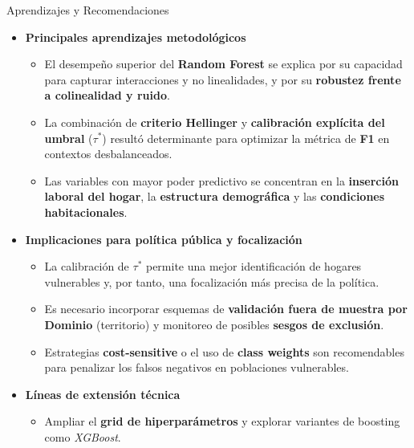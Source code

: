 \documentclass[10pt]{beamer}
\begin{document}
\begin{frame}{Aprendizajes y Recomendaciones}
\small
\begin{itemize}
  \item \textbf{Principales aprendizajes metodológicos}
  \begin{itemize}
    \item El desempeño superior del \textbf{Random Forest} se explica por su capacidad para capturar interacciones y no linealidades, y por su \textbf{robustez frente a colinealidad y ruido}.
    \item La combinación de \textbf{criterio Hellinger} y \textbf{calibración explícita del umbral} ($\tau^{*}$) resultó determinante para optimizar la métrica de \textbf{F1} en contextos desbalanceados.
    \item Las variables con mayor poder predictivo se concentran en la \textbf{inserción laboral del hogar}, la \textbf{estructura demográfica} y las \textbf{condiciones habitacionales}.
  \end{itemize}

  \item \textbf{Implicaciones para política pública y focalización}
  \begin{itemize}
    \item La calibración de $\tau^{*}$ permite una mejor identificación de hogares vulnerables y, por tanto, una focalización más precisa de la política.
    \item Es necesario incorporar esquemas de \textbf{validación fuera de muestra por Dominio} (territorio) y monitoreo de posibles \textbf{sesgos de exclusión}.
    \item Estrategias \textbf{cost-sensitive} o el uso de \textbf{class weights} son recomendables para penalizar los falsos negativos en poblaciones vulnerables.
  \end{itemize}

  \item \textbf{Líneas de extensión técnica}
  \begin{itemize}
    \item Ampliar el \textbf{grid de hiperparámetros} y explorar variantes de boosting como \textit{XGBoost}.


  \end{itemize}
\end{itemize}
\end{frame}
\end{document}
